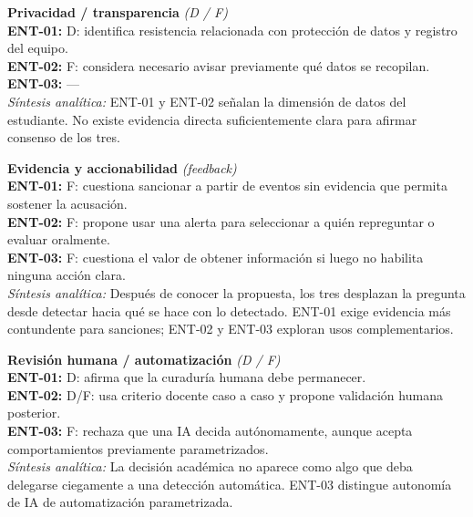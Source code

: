 \begin{center}
\begin{infobox}
\textbf{\textcolor{accent}{Privacidad / transparencia}} \textit{(D / F)}\\
\textbf{ENT-01:} D: identifica resistencia relacionada con protección de datos y registro del equipo.\\
\textbf{ENT-02:} F: considera necesario avisar previamente qué datos se recopilan.\\
\textbf{ENT-03:} ---\\
\textit{Síntesis analítica:} ENT-01 y ENT-02 señalan la dimensión de datos del estudiante. No existe evidencia directa suficientemente clara para afirmar consenso de los tres.
\end{infobox}
\vspace{2pt}
\begin{infobox}
\textbf{\textcolor{accent}{Evidencia y accionabilidad}} \textit{(feedback)}\\
\textbf{ENT-01:} F: cuestiona sancionar a partir de eventos sin evidencia que permita sostener la acusación.\\
\textbf{ENT-02:} F: propone usar una alerta para seleccionar a quién repreguntar o evaluar oralmente.\\
\textbf{ENT-03:} F: cuestiona el valor de obtener información si luego no habilita ninguna acción clara.\\
\textit{Síntesis analítica:} Después de conocer la propuesta, los tres desplazan la pregunta desde detectar hacia qué se hace con lo detectado. ENT-01 exige evidencia más contundente para sanciones; ENT-02 y ENT-03 exploran usos complementarios.
\end{infobox}
\vspace{2pt}
\begin{infobox}
\textbf{\textcolor{accent}{Revisión humana / automatización}} \textit{(D / F)}\\
\textbf{ENT-01:} D: afirma que la curaduría humana debe permanecer.\\
\textbf{ENT-02:} D/F: usa criterio docente caso a caso y propone validación humana posterior.\\
\textbf{ENT-03:} F: rechaza que una IA decida autónomamente, aunque acepta comportamientos previamente parametrizados.\\
\textit{Síntesis analítica:} La decisión académica no aparece como algo que deba delegarse ciegamente a una detección automática. ENT-03 distingue autonomía de IA de automatización parametrizada.
\end{infobox}
\vspace{2pt}
\begin{infobox}

\end{infobox}
\end{center}
